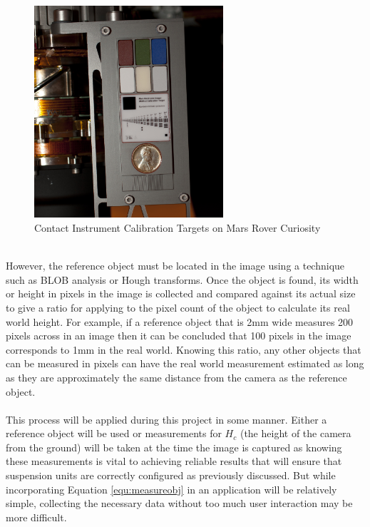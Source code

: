 	\begin{figure}[h!]
		\centering
		\includegraphics[width=7cm]{../images/curiosity_calibration_chart.jpg}
		\caption{Contact Instrument Calibration Targets on Mars Rover Curiosity \citep{curiosity_image_calibration}}
		\label{fig:curiosity_calibration_chart}
	\end{figure}\\
	However, the reference object must be located in the image using a technique such as  BLOB analysis or Hough transforms. Once the object is found, its width or height in pixels in the image is collected and compared against its actual size to give a ratio for applying to the pixel count of the object to calculate its real world height. For example, if a reference object that is 2mm wide measures 200 pixels across in an image then it can be concluded that 100 pixels in the image corresponds to 1mm in the real world. Knowing this ratio, any other objects that can be measured in pixels can have the real world measurement estimated as long as they are approximately the same distance from the camera as the reference object.
	\\\\
	This process will be applied during this project in some manner. Either a reference object will be used or measurements for $H_c$ (the height of the camera from the ground) will be taken at the time the image is captured as knowing these measurements is vital to achieving reliable results that will ensure that suspension units are correctly configured as previously discussed. But while incorporating Equation \ref{equ:measureobj} in an application will be relatively simple, collecting the necessary data without too much user interaction may be more difficult.